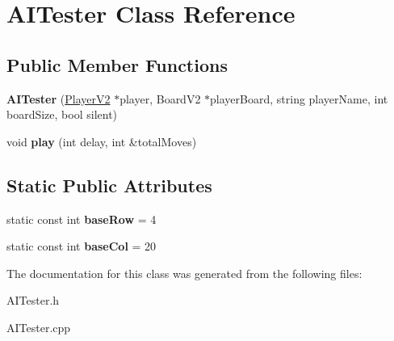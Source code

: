 \hypertarget{classAITester}{}\section{A\+I\+Tester Class Reference}
\label{classAITester}
\subsection*{Public Member Functions}
\begin{DoxyCompactItemize}
\item 
{\bfseries A\+I\+Tester} (\hyperlink{classPlayerV2}{Player\+V2} $\ast$player, Board\+V2 $\ast$player\+Board, string player\+Name, int board\+Size, bool silent)\hypertarget{classAITester_a7b1901d810197d055aacbdcc0871a96b}{}\label{classAITester_a7b1901d810197d055aacbdcc0871a96b}

\item 
void {\bfseries play} (int delay, int \&total\+Moves)\hypertarget{classAITester_a052eadb983e80ccb5fac49c2f141420a}{}\label{classAITester_a052eadb983e80ccb5fac49c2f141420a}

\end{DoxyCompactItemize}
\subsection*{Static Public Attributes}
\begin{DoxyCompactItemize}
\item 
static const int {\bfseries base\+Row} = 4\hypertarget{classAITester_ab682571d20b7b7eb8e9f79f0a39c220d}{}\label{classAITester_ab682571d20b7b7eb8e9f79f0a39c220d}

\item 
static const int {\bfseries base\+Col} = 20\hypertarget{classAITester_aa35eb3d663549404864e50a8c006c238}{}\label{classAITester_aa35eb3d663549404864e50a8c006c238}

\end{DoxyCompactItemize}


The documentation for this class was generated from the following files\+:\begin{DoxyCompactItemize}
\item 
A\+I\+Tester.\+h\item 
A\+I\+Tester.\+cpp\end{DoxyCompactItemize}
